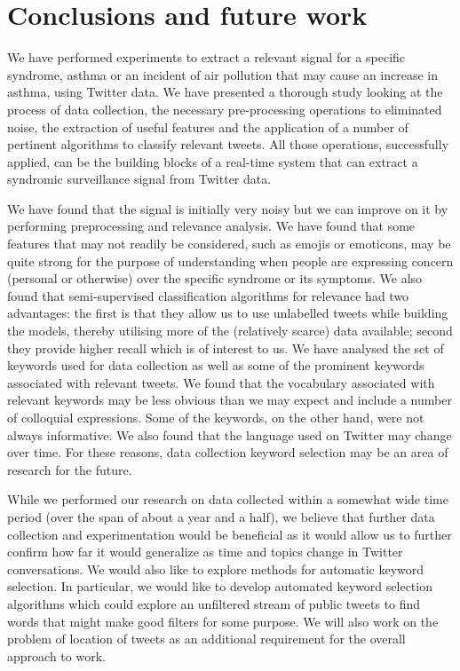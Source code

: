 \documentclass[10pt,letterpaper]{article}
\begin{document}
\section{Conclusions and future work}  
\label{Conclusions}
We have performed experiments to extract a relevant signal for a specific syndrome, asthma or an incident of air pollution that may cause an increase in asthma, using Twitter data. We have presented a thorough study looking at the process of data collection, the necessary pre-processing operations to eliminated noise, the extraction of useful features and the application of a number of pertinent algorithms to classify relevant tweets.  All those operations, successfully applied, can be the building blocks of  a real-time system that can extract a syndromic surveillance signal from Twitter data. 

We have found that the signal is initially very noisy but we can improve on it by performing preprocessing and relevance analysis.  We have found that some features that may not readily be considered, such as emojis or emoticons, may be quite strong for the purpose of understanding when people are expressing concern (personal or otherwise) over the specific syndrome or its symptoms.  We also found that semi-supervised classification algorithms for relevance had two advantages: the first is that they allow us to use unlabelled tweets while building the models, thereby utilising more of the (relatively scarce) data available; second they provide higher recall which is of interest to us.  We have analysed the set of keywords used for data collection as well as some of the prominent keywords associated with relevant tweets.  We found that the vocabulary associated with relevant keywords may be less obvious than we may expect and include a number of colloquial expressions. Some of the keywords, on the other hand, were not always informative. We also found that the language used on Twitter may change over time. For these reasons, data collection keyword selection may be an area of research for the future.  

While we performed our research on data collected within a somewhat wide time period (over the span of about a year and a half), we believe that further data collection and experimentation would be beneficial as it would allow us to further confirm how far it would generalize as time and topics change in Twitter conversations.  We would also like to explore methods for automatic keyword selection.  In particular, we would like to develop automated keyword selection algorithms which could explore an unfiltered stream of public tweets to find words that might make good filters for some purpose.  We will also work on the problem of location of tweets as an additional requirement for the overall approach to work.  
\end{document}

